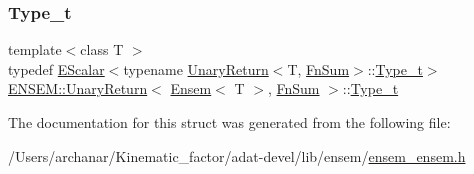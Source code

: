 \mbox{\label{structENSEM_1_1UnaryReturn_3_01Ensem_3_01T_01_4_00_01FnSum_01_4_ad99eb2820cca4a76378ee89c9abbf4e3}} 
\subsubsection{\texorpdfstring{Type\_t}{Type\_t}\hspace{0.1cm}{\footnotesize\ttfamily [3/3]}}
{\footnotesize\ttfamily template$<$class T $>$ \\
typedef \mbox{\hyperlink{classENSEM_1_1EScalar}{E\+Scalar}}$<$typename \mbox{\hyperlink{structENSEM_1_1UnaryReturn}{Unary\+Return}}$<$T, \mbox{\hyperlink{structENSEM_1_1FnSum}{Fn\+Sum}}$>$\+::\mbox{\hyperlink{structENSEM_1_1UnaryReturn_3_01Ensem_3_01T_01_4_00_01FnSum_01_4_ad99eb2820cca4a76378ee89c9abbf4e3}{Type\+\_\+t}}$>$ \mbox{\hyperlink{structENSEM_1_1UnaryReturn}{E\+N\+S\+E\+M\+::\+Unary\+Return}}$<$ \mbox{\hyperlink{classENSEM_1_1Ensem}{Ensem}}$<$ T $>$, \mbox{\hyperlink{structENSEM_1_1FnSum}{Fn\+Sum}} $>$\+::\mbox{\hyperlink{structENSEM_1_1UnaryReturn_3_01Ensem_3_01T_01_4_00_01FnSum_01_4_ad99eb2820cca4a76378ee89c9abbf4e3}{Type\+\_\+t}}}



The documentation for this struct was generated from the following file\+:\begin{DoxyCompactItemize}
\item 
/\+Users/archanar/\+Kinematic\+\_\+factor/adat-\/devel/lib/ensem/\mbox{\hyperlink{adat-devel_2lib_2ensem_2ensem__ensem_8h}{ensem\+\_\+ensem.\+h}}\end{DoxyCompactItemize}
